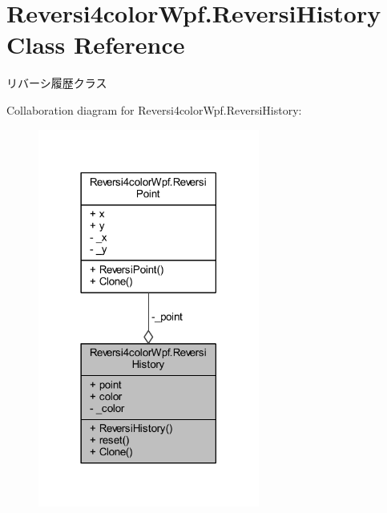 \hypertarget{class_reversi4color_wpf_1_1_reversi_history}{}\section{Reversi4color\+Wpf.\+Reversi\+History Class Reference}
\label{class_reversi4color_wpf_1_1_reversi_history}


リバーシ履歴クラス  




Collaboration diagram for Reversi4color\+Wpf.\+Reversi\+History\+:
\nopagebreak
\begin{figure}[H]
\begin{center}
\leavevmode
\includegraphics[width=206pt]{class_reversi4color_wpf_1_1_reversi_history__coll__graph}
\end{center}
\end{figure}
